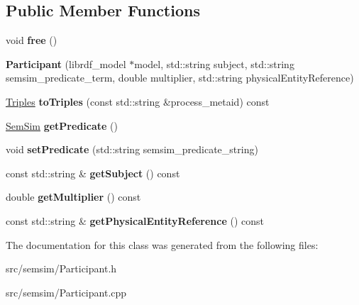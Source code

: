 \subsection*{Public Member Functions}
\begin{DoxyCompactItemize}
\item 
\mbox{\label{classsemsim_1_1Participant_a7ff795c36df78aab96143b41ae91bbc2}} 
void {\bfseries free} ()
\item 
\mbox{\label{classsemsim_1_1Participant_aae54a8e515392c073a65bf6cb0915656}} 
{\bfseries Participant} (librdf\+\_\+model $\ast$model, std\+::string subject, std\+::string semsim\+\_\+predicate\+\_\+term, double multiplier, std\+::string physical\+Entity\+Reference)
\item 
\mbox{\label{classsemsim_1_1Participant_a0713dcb34036f27f80ff2551b979add4}} 
\hyperlink{classsemsim_1_1Triples}{Triples} {\bfseries to\+Triples} (const std\+::string \&process\+\_\+metaid) const
\item 
\mbox{\label{classsemsim_1_1Participant_a0d3d2dbb034cad4729312cae8ecf81d8}} 
\hyperlink{classsemsim_1_1SemSim}{Sem\+Sim} {\bfseries get\+Predicate} ()
\item 
\mbox{\label{classsemsim_1_1Participant_a01b7a448760d6e8a088adef0efe9964a}} 
void {\bfseries set\+Predicate} (std\+::string semsim\+\_\+predicate\+\_\+string)
\item 
\mbox{\label{classsemsim_1_1Participant_acfdc8056b288b3e36d54248d03d96c5c}} 
const std\+::string \& {\bfseries get\+Subject} () const
\item 
\mbox{\label{classsemsim_1_1Participant_aca088588f5fa41042be8cc43ceeb7962}} 
double {\bfseries get\+Multiplier} () const
\item 
\mbox{\label{classsemsim_1_1Participant_a7c9e14ea7bc01d2fc6b655a990b370f3}} 
const std\+::string \& {\bfseries get\+Physical\+Entity\+Reference} () const
\end{DoxyCompactItemize}


The documentation for this class was generated from the following files\+:\begin{DoxyCompactItemize}
\item 
src/semsim/Participant.\+h\item 
src/semsim/Participant.\+cpp\end{DoxyCompactItemize}
